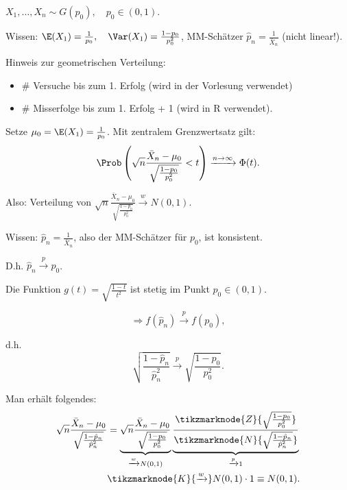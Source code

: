 \documentclass{tstextbook}
\begin{document}
\begin{example}
	$ X_1, \ldots, X_n \sim G(p_0), \quad p_0 \in (0,1) $. 
	
	Wissen: $ \E(X_1) = \frac{1}{p_0}, \quad \Var(X_1) = \frac{1-p_0}{p_0^2} $, MM-Schätzer $ \hat{p}_n = \frac{1}{\bar{X}_n} $ (nicht linear!).
	
	Hinweis zur geometrischen Verteilung: 
	\begin{itemize}
	\item $ \# $ Versuche bis zum 1. Erfolg (wird in der Vorlesung verwendet)
	\item $ \# $ Misserfolge bis zum 1. Erfolg + 1 (wird in R verwendet).
	\end{itemize}

	Setze $ \mu_0 = \E(X_1) = \frac{1}{p_0} $. Mit zentralem Grenzwertsatz gilt: 
	\[
	\Prob\left(\sqrt{n} \frac{\bar{X}_n - \mu_0}{\sqrt{\frac{1-p_0}{p_0^2}}} < t \right) \xrightarrow{n\to\infty} \Phi(t).
	\]
	
	Also: Verteilung von $ \sqrt{n} \frac{\bar{X}_n - \mu_0}{\sqrt{\frac{1-p_0}{p_0^2}}} \xrightarrow{w} N(0,1) $.
	
	
	
	Wissen:  $ \hat{p}_n = \frac{1}{\bar{X}_n} $, also der MM-Schätzer für $ p_0 $, ist konsistent. 
	
	D.h. $ \hat{p}_n \xrightarrow{p} p_0 $. 
	
	Die Funktion $ g(t) = \sqrt{\frac{1-t}{t^2}} $ ist stetig im Punkt $ p_0 \in (0,1) $. 
	
	\[ \Rightarrow f(\hat{p}_n) \xrightarrow{p} f(p_0), \] 
	
	d.h. \[ \sqrt{\frac{1-\hat{p}_n}{\hat{p}_n^2}} \xrightarrow{p} \sqrt{\frac{1-p_0}{p_0^2}}. \]
	
	Man erhält folgendes: 
	\[
	\begin{aligned}
		\sqrt{n}\frac{\bar{X}_n - \mu_0}{\sqrt{\frac{1-\hat{p}_n}{\hat{p}_n^2}}} & = \underbrace{\sqrt{n}\frac{\bar{X}_n - \mu_0}{\sqrt{\frac{1-p_0}{p_0^2}}}}_{\xrightarrow{w} N(0,1)} \underbrace{\frac{\tikzmarknode{Z}{\sqrt{\frac{1-p_0}{p_0^2}}}}{\tikzmarknode{N}{\sqrt{\frac{1-\hat{p}_n}{\hat{p}_n^2}}}}}_{\xrightarrow{p}1} \\
		& \tikzmarknode{K}{\xrightarrow{w}} N(0,1)\cdot 1 \equiv N(0,1).
	\end{aligned}
	\]
	

\end{example}
\end{document}
